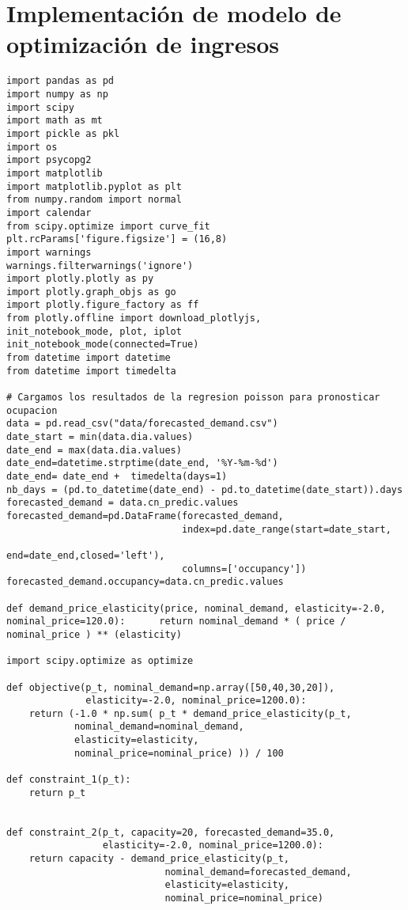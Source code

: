 \chapter{Implementación de modelo de optimización de ingresos}
\label{ch:anexod}

\begin{verbatim}
import pandas as pd
import numpy as np
import scipy
import math as mt
import pickle as pkl
import os
import psycopg2
import matplotlib
import matplotlib.pyplot as plt
from numpy.random import normal
import calendar
from scipy.optimize import curve_fit
plt.rcParams['figure.figsize'] = (16,8)
import warnings
warnings.filterwarnings('ignore')
import plotly.plotly as py
import plotly.graph_objs as go
import plotly.figure_factory as ff
from plotly.offline import download_plotlyjs, 
init_notebook_mode, plot, iplot
init_notebook_mode(connected=True)
from datetime import datetime
from datetime import timedelta

# Cargamos los resultados de la regresion poisson para pronosticar ocupacion
data = pd.read_csv("data/forecasted_demand.csv")
date_start = min(data.dia.values)
date_end = max(data.dia.values)
date_end=datetime.strptime(date_end, '%Y-%m-%d')
date_end= date_end +  timedelta(days=1)
nb_days = (pd.to_datetime(date_end) - pd.to_datetime(date_start)).days
forecasted_demand = data.cn_predic.values
forecasted_demand=pd.DataFrame(forecasted_demand,
                               index=pd.date_range(start=date_start,
                                                   end=date_end,closed='left'),
                               columns=['occupancy'])
forecasted_demand.occupancy=data.cn_predic.values

def demand_price_elasticity(price, nominal_demand, elasticity=-2.0, nominal_price=120.0):      return nominal_demand * ( price / nominal_price ) ** (elasticity)

import scipy.optimize as optimize

def objective(p_t, nominal_demand=np.array([50,40,30,20]),
              elasticity=-2.0, nominal_price=1200.0):
    return (-1.0 * np.sum( p_t * demand_price_elasticity(p_t, 
            nominal_demand=nominal_demand,
            elasticity=elasticity,
            nominal_price=nominal_price) )) / 100

def constraint_1(p_t):
    return p_t


def constraint_2(p_t, capacity=20, forecasted_demand=35.0,
                 elasticity=-2.0, nominal_price=1200.0):
    return capacity - demand_price_elasticity(p_t, 
                            nominal_demand=forecasted_demand,
                            elasticity=elasticity,
                            nominal_price=nominal_price)


\end{verbatim}
